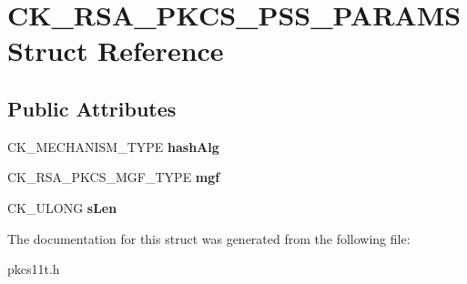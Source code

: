 \hypertarget{struct_c_k___r_s_a___p_k_c_s___p_s_s___p_a_r_a_m_s}{}\section{C\+K\+\_\+\+R\+S\+A\+\_\+\+P\+K\+C\+S\+\_\+\+P\+S\+S\+\_\+\+P\+A\+R\+A\+MS Struct Reference}
\label{struct_c_k___r_s_a___p_k_c_s___p_s_s___p_a_r_a_m_s}
\subsection*{Public Attributes}
\begin{DoxyCompactItemize}
\item 
\mbox{\label{struct_c_k___r_s_a___p_k_c_s___p_s_s___p_a_r_a_m_s_aa4db3297a22a4148dbb5d96f33d10845}} 
C\+K\+\_\+\+M\+E\+C\+H\+A\+N\+I\+S\+M\+\_\+\+T\+Y\+PE {\bfseries hash\+Alg}
\item 
\mbox{\label{struct_c_k___r_s_a___p_k_c_s___p_s_s___p_a_r_a_m_s_a61dc8196e9a08bb24683c6d4836fdd75}} 
C\+K\+\_\+\+R\+S\+A\+\_\+\+P\+K\+C\+S\+\_\+\+M\+G\+F\+\_\+\+T\+Y\+PE {\bfseries mgf}
\item 
\mbox{\label{struct_c_k___r_s_a___p_k_c_s___p_s_s___p_a_r_a_m_s_a04aaadbd6be8a61d43ea4a15b6c562ed}} 
C\+K\+\_\+\+U\+L\+O\+NG {\bfseries s\+Len}
\end{DoxyCompactItemize}


The documentation for this struct was generated from the following file\+:\begin{DoxyCompactItemize}
\item 
pkcs11t.\+h\end{DoxyCompactItemize}
